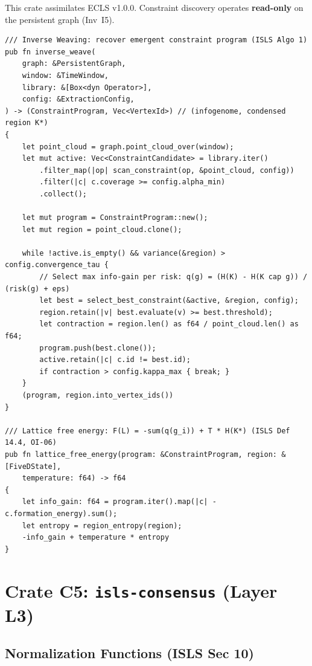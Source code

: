 \documentclass[10pt,a4paper]{article}
\theoremstyle{definition}\newtheorem{definition}{Def}[section]
\theoremstyle{plain}\newtheorem{theorem}{Thm}[section]
\newcommand{\crate}[1]{\texttt{\small\color{rustborder!80!black}#1}}
\begin{document}
This crate assimilates ECLS v1.0.0. Constraint discovery operates \textbf{read-only} on the persistent graph (Inv~I5).

\begin{lstlisting}[style=rust]
/// Inverse Weaving: recover emergent constraint program (ISLS Algo 1)
pub fn inverse_weave(
    graph: &PersistentGraph,
    window: &TimeWindow,
    library: &[Box<dyn Operator>],
    config: &ExtractionConfig,
) -> (ConstraintProgram, Vec<VertexId>) // (infogenome, condensed region K*)
{
    let point_cloud = graph.point_cloud_over(window);
    let mut active: Vec<ConstraintCandidate> = library.iter()
        .filter_map(|op| scan_constraint(op, &point_cloud, config))
        .filter(|c| c.coverage >= config.alpha_min)
        .collect();

    let mut program = ConstraintProgram::new();
    let mut region = point_cloud.clone();

    while !active.is_empty() && variance(&region) > config.convergence_tau {
        // Select max info-gain per risk: q(g) = (H(K) - H(K cap g)) / (risk(g) + eps)
        let best = select_best_constraint(&active, &region, config);
        region.retain(|v| best.evaluate(v) >= best.threshold);
        let contraction = region.len() as f64 / point_cloud.len() as f64;
        program.push(best.clone());
        active.retain(|c| c.id != best.id);
        if contraction > config.kappa_max { break; }
    }
    (program, region.into_vertex_ids())
}

/// Lattice free energy: F(L) = -sum(q(g_i)) + T * H(K*) (ISLS Def 14.4, OI-06)
pub fn lattice_free_energy(program: &ConstraintProgram, region: &[FiveDState],
    temperature: f64) -> f64
{
    let info_gain: f64 = program.iter().map(|c| -c.formation_energy).sum();
    let entropy = region_entropy(region);
    -info_gain + temperature * entropy
}
\end{lstlisting}

\section{Crate C5: \crate{isls-consensus} (Layer L3)}
\label{sec:c5}

\subsection{Normalization Functions (ISLS Sec 10)}
\end{document}
